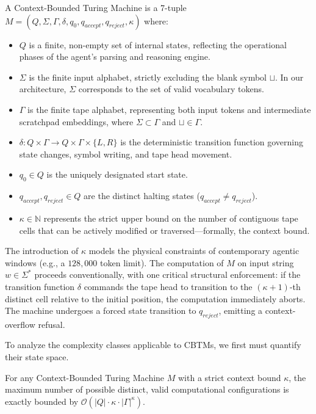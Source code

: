 \begin{definition}
\label{def:cbtm}
A Context-Bounded Turing Machine is a 7-tuple $M = (Q, \Sigma, \Gamma, \delta, q_0, q_{accept}, q_{reject}, \kappa)$ where:
\begin{itemize}
    \item $Q$ is a finite, non-empty set of internal states, reflecting the operational phases of the agent's parsing and reasoning engine.
    \item $\Sigma$ is the finite input alphabet, strictly excluding the blank symbol $\sqcup$. In our architecture, $\Sigma$ corresponds to the set of valid vocabulary tokens.
    \item $\Gamma$ is the finite tape alphabet, representing both input tokens and intermediate scratchpad embeddings, where $\Sigma \subset \Gamma$ and $\sqcup \in \Gamma$.
    \item $\delta: Q \times \Gamma \rightarrow Q \times \Gamma \times \{L, R\}$ is the deterministic transition function governing state changes, symbol writing, and tape head movement.
    \item $q_0 \in Q$ is the uniquely designated start state.
    \item $q_{accept}, q_{reject} \in Q$ are the distinct halting states ($q_{accept} \neq q_{reject}$).
    \item $\kappa \in \mathbb{N}$ represents the strict upper bound on the number of contiguous tape cells that can be actively modified or traversed—formally, the context bound.
\end{itemize}
\end{definition}

The introduction of $\kappa$ models the physical constraints of contemporary agentic windows (e.g., a $128,000$ token limit). The computation of $M$ on input string $w \in \Sigma^*$ proceeds conventionally, with one critical structural enforcement: if the transition function $\delta$ commands the tape head to transition to the $(\kappa+1)$-th distinct cell relative to the initial position, the computation immediately aborts. The machine undergoes a forced state transition to $q_{reject}$, emitting a context-overflow refusal. 

To analyze the complexity classes applicable to CBTMs, we first must quantify their state space.

\begin{lemma}
\label{lem:finite_config}
For any Context-Bounded Turing Machine $M$ with a strict context bound $\kappa$, the maximum number of possible distinct, valid computational configurations is exactly bounded by $\mathcal{O}(|Q| \cdot \kappa \cdot |\Gamma|^\kappa)$.
\end{lemma}

